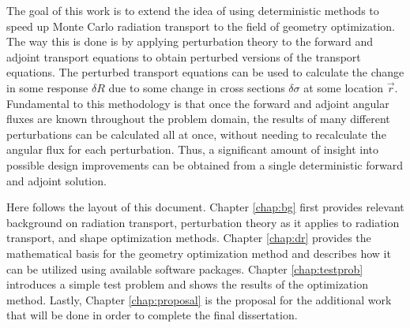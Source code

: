 The goal of this work is to extend the idea of using deterministic methods to speed up Monte Carlo radiation transport to the field of geometry optimization.
The way this is done is by applying perturbation theory to the forward and adjoint transport equations to obtain perturbed versions of the transport equations.
The perturbed transport equations can be used to calculate the change in some response $\delta R$ due to some change in cross sections $\delta\sigma$ at some location $\vec{r}$.
Fundamental to this methodology is that once the forward and adjoint angular fluxes are known throughout the problem domain, the results of many different perturbations can be calculated all at once, without needing to recalculate the angular flux for each perturbation.
Thus, a significant amount of insight into possible design improvements can be obtained from a single deterministic forward and adjoint solution.

Here follows the layout of this document.
Chapter \ref{chap:bg} first provides relevant background on radiation transport, perturbation theory as it applies to radiation transport, and shape optimization methods.
Chapter \ref{chap:dr} provides the mathematical basis for the geometry optimization method and describes how it can be utilized using available software packages.
Chapter \ref{chap:testprob} introduces a simple test problem and shows the results of the optimization method.
Lastly, Chapter \ref{chap:proposal} is the proposal for the additional work that will be done in order to complete the final dissertation.


